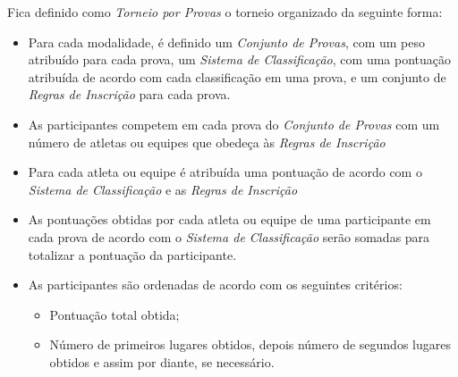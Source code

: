 \noindent
Fica definido como \textit{Torneio por Provas} o torneio organizado da seguinte forma:
\begin{itemize}[noitemsep]
	\item Para cada modalidade, é definido um \textit{Conjunto de Provas}, com um peso atribuído para cada prova, um \textit{Sistema de Classificação}, com uma pontuação atribuída de acordo com cada classificação em uma prova, e um conjunto de \textit{Regras de Inscrição} para cada prova.

	\item As participantes competem em cada prova do \textit{Conjunto de Provas} com um número de atletas ou equipes que obedeça às \textit{Regras de Inscrição}

	\item Para cada atleta ou equipe é atribuída uma pontuação de acordo com o \textit{Sistema de Classificação} e as \textit{Regras de Inscrição}

	\item As pontuações obtidas por cada atleta ou equipe de uma participante em cada prova de acordo com o \textit{Sistema de Classificação} serão somadas para totalizar a pontuação da participante.

	\item As participantes são ordenadas de acordo com os seguintes critérios:
	\begin{itemize}[noitemsep]
		\item Pontuação total obtida;
		\item Número de primeiros lugares obtidos, depois número de segundos lugares obtidos e assim por diante, se necessário.
	\end{itemize}
\end{itemize}
